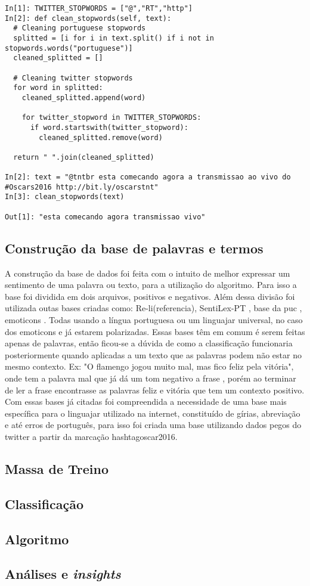\begin{lstlisting}[style=python, frame=single]
In[1]: TWITTER_STOPWORDS = ["@","RT","http"]
In[2]: def clean_stopwords(self, text):
  # Cleaning portuguese stopwords
  splitted = [i for i in text.split() if i not in stopwords.words("portuguese")]
  cleaned_splitted = []

  # Cleaning twitter stopwords
  for word in splitted:
    cleaned_splitted.append(word)

    for twitter_stopword in TWITTER_STOPWORDS:
      if word.startswith(twitter_stopword):
        cleaned_splitted.remove(word)

  return " ".join(cleaned_splitted)

In[2]: text = "@tntbr esta comecando agora a transmissao ao vivo do #Oscars2016 http://bit.ly/oscarstnt"
In[3]: clean_stopwords(text)

Out[1]: "esta comecando agora transmissao vivo"

\end{lstlisting}



\subsection{Construção da base de palavras e termos}
A construção da base de dados foi feita com o intuito de melhor expressar um sentimento de uma palavra ou texto, para a utilização do algoritmo. Para isso a base foi dividida em dois arquivos, positivos e negativos. Além dessa divisão foi utilizada outas bases criadas como: Re-li(referencia), SentiLex-PT \cite{marioj.silvapaulacarvalholuissarmento2012}, base da puc \cite{freitas2013construccao}, emoticons \cite{alexanderhogenboomdaniellabalflaviusfrasincarmalissabalfranciskadejonguzaykaymak}. Todas usando a língua portuguesa ou um linguajar universal, no caso dos emoticons e já estarem polarizadas. Essas bases têm em comum é serem feitas apenas de palavras, então ficou-se a dúvida de como a classificação funcionaria posteriormente quando aplicadas a um texto que as palavras podem não estar no mesmo contexto. Ex: "O flamengo jogou muito mal, mas fico feliz pela vitória", onde tem a palavra mal que já dá um tom negativo a frase , porém ao terminar de ler a frase encontrasse as palavras feliz e vitória que tem um contexto positivo.
Com essas bases já citadas foi compreendida a necessidade de uma base mais específica para o linguajar utilizado na internet, constituído de  
gírias, abreviação e até erros de português, para isso foi criada uma base utilizando dados pegos do twitter a partir da marcação hashtagoscar2016.

\subsection{Massa de Treino}

\subsection{Classificação}

\subsection{Algoritmo}

\subsection{Análises e \textit{insights}}